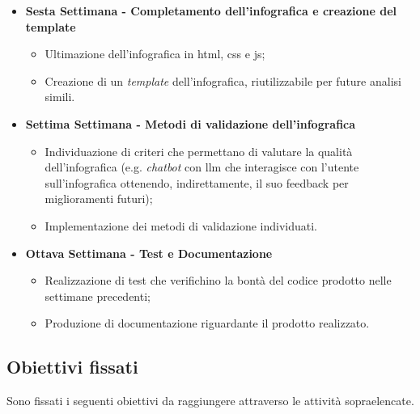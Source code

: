 \begin{itemize}
    \item \textbf{Sesta Settimana - Completamento dell'infografica e creazione del template} 
    \begin{itemize}
        \item Ultimazione dell'infografica in \gls{html}, \gls{css} e \gls{js};
        \item Creazione di un \emph{template} dell'infografica, riutilizzabile per future analisi simili.
    \end{itemize}
    \item \textbf{Settima Settimana - Metodi di validazione dell'infografica} 
    \begin{itemize}
        \item Individuazione di criteri che permettano di valutare la qualità dell'infografica (e.g. \textit{chatbot} con \gls{llm} che interagisce con l'utente sull'infografica ottenendo, indirettamente, il suo feedback per miglioramenti futuri);
        \item Implementazione dei metodi di validazione individuati.
    \end{itemize}
    \item \textbf{Ottava Settimana - Test e Documentazione} 
    \begin{itemize}
        \item Realizzazione di test che verifichino la bontà del codice prodotto nelle settimane precedenti;
        \item Produzione di documentazione riguardante il prodotto realizzato.
    \end{itemize}
\end{itemize}


\subsection{Obiettivi fissati}
Sono fissati i seguenti obiettivi da raggiungere attraverso le attività sopraelencate.

